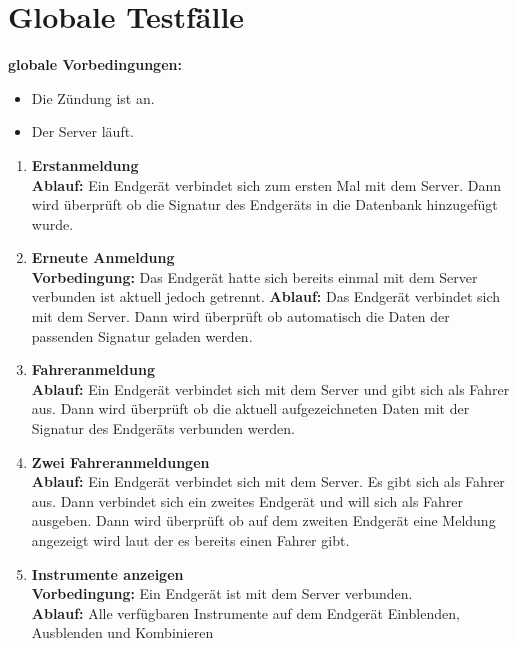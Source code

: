 \documentclass[pflichtenheft.tex]{subfiles}
\begin{document}
\chapter{Globale Testfälle}

\renewcommand{\theenumi}{/GT\ifnum \value{enumi}<10 0\fi\arabic{enumi}0/}
\renewcommand{\labelenumi}{\theenumi}
\renewcommand{\theenumii}{\arabic{enumii}}
\renewcommand{\labelenumii}{GT\ifnum \value{enumi}<10 0\fi\arabic{enumi}\arabic{enumii}/}

\textbf{globale Vorbedingungen:}
\begin{itemize}
\item
Die Zündung ist an.
\item
Der Server läuft.
\end{itemize}

\begin{enumerate}

\item{\textbf{Erstanmeldung}} \\
\textbf{Ablauf: } Ein Endgerät verbindet sich zum ersten Mal mit dem Server. Dann wird überprüft ob die Signatur des Endgeräts in die Datenbank hinzugefügt wurde.

\item{\textbf{Erneute Anmeldung}} \\
\textbf{Vorbedingung: } Das Endgerät hatte sich bereits einmal mit dem Server verbunden ist aktuell jedoch getrennt.
\textbf{Ablauf: } Das Endgerät verbindet sich mit dem Server. Dann wird überprüft ob automatisch die Daten der passenden Signatur geladen werden.

\item{\textbf{Fahreranmeldung}} \\
\textbf{Ablauf: } Ein Endgerät verbindet sich mit dem Server und gibt sich als Fahrer aus. Dann wird überprüft ob die aktuell aufgezeichneten Daten mit der Signatur des Endgeräts verbunden werden.

\item{\textbf{Zwei Fahreranmeldungen}} \\
\textbf{Ablauf: } Ein Endgerät verbindet sich mit dem Server. Es gibt sich als Fahrer aus. Dann verbindet sich ein zweites Endgerät und will sich als Fahrer ausgeben. Dann wird überprüft ob auf dem zweiten Endgerät eine Meldung angezeigt wird laut der es bereits einen Fahrer gibt.


\item{\textbf{Instrumente anzeigen}} \\
\textbf{Vorbedingung: } Ein Endgerät ist mit dem Server verbunden. \\
\textbf{Ablauf: } Alle verfügbaren Instrumente auf dem Endgerät Einblenden, Ausblenden und Kombinieren


\end{enumerate}
\end{document}
